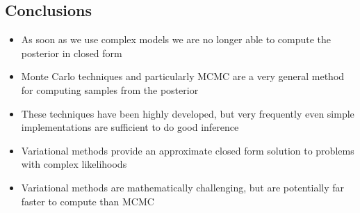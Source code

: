 
\begin{slide}
\section{Conclusions}

\begin{PauseHighLight}
  \begin{itemize}
  \item As soon as we use complex models we are no longer able to
    compute the posterior in closed form\pause
  \item Monte Carlo techniques and particularly MCMC are a very general
    method for computing samples from the posterior\pause
  \item These techniques have been highly developed, but very frequently
    even simple implementations are sufficient to do good
    inference\pause
  \item Variational methods provide an approximate closed form solution
    to problems with complex likelihoods\pause
  \item Variational methods are mathematically challenging, but are
    potentially far faster to compute than MCMC\pause
  \end{itemize}
\end{PauseHighLight}

\end{slide}

